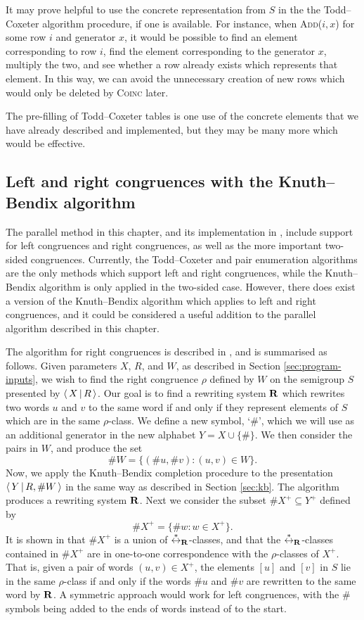 It may prove helpful to use the concrete representation from $S$ in the the Todd--Coxeter algorithm
procedure, if one is available.  For instance, when \textsc{Add($i, x$)} for some
row $i$ and generator $x$, it would be possible to find an element corresponding
to row $i$, find the element corresponding to the generator $x$, multiply the
two, and see whether a row already exists which represents that element.  In
this way, we can avoid the unnecessary creation of new rows which would only be
deleted by \textsc{Coinc} later.

The pre-filling of Todd--Coxeter tables is one use of the concrete elements that
we have already described and implemented, but they may be many more which would
be effective.

\subsection{Left and right congruences with the Knuth--Bendix algorithm}
\label{sec:kb-l-r}
The parallel method in this chapter, and its implementation in \libsemigroups{},
include support for left congruences and right congruences, as well as the more
important two-sided congruences.  Currently, the Todd--Coxeter and pair enumeration
algorithms are the only methods which support left and right congruences, while
the Knuth--Bendix algorithm is only applied in the two-sided case.  However, there does exist
a version of the Knuth--Bendix algorithm which applies to left and right congruences, and
it could be considered a useful addition to the parallel algorithm described in
this chapter.

The algorithm for right congruences is described in \cite[\S2.8]{sims}, and is
summarised as follows.  Given parameters $X$, $R$, and $W$, as described in
Section \ref{sec:program-inputs}, we wish to find the right congruence $\rho$
defined by $W$ on the semigroup $S$ presented by $\left\langle \, X \, \middle| \, R \, \right\rangle$.
Our goal is to find a rewriting system $\mathbf{R}$ which rewrites two words $u$ and
$v$ to the same word if and only if they represent elements of $S$ which are in
the same $\rho$-class.  We define a new symbol, `$\#$', which we will use as an
additional generator in the new alphabet $Y = X \cup \{\#\}$.  We then consider the
pairs in $W$, and produce the set
$$\#W = \{(\#u, \#v) : (u, v) \in W\}.$$
Now, we apply the Knuth--Bendix completion procedure to the presentation
$\left\langle \, Y \, \middle| \, R, \#W \, \right\rangle$ in the same way as described in Section \ref{sec:kb}.  The
algorithm produces a rewriting system $\mathbf{R}$.  Next we consider the subset
$\#X^+ \subseteq Y^+$ defined by
$$\#X^+ = \{\#w : w \in X^+\}.$$
It is shown in \cite[\S2.8]{sims} that $\#X^+$ is a union of
$\stackrel{*}{\leftrightarrow}_{\mathbf{R}}$-classes, and that the $\stackrel{*}{\leftrightarrow}_{\mathbf{R}}$-classes contained in $\#X^+$
are in one-to-one correspondence with the $\rho$-classes of $X^+$.  That is,
given a pair of words $(u,v) \in X^+$, the elements $[u]$ and $[v]$ in $S$ lie
in the same $\rho$-class if and only if the words $\#u$ and $\#v$ are rewritten to
the same word by $\mathbf{R}$.  A symmetric approach would work for left congruences,
with the $\#$ symbols being added to the ends of words instead of to the start.

